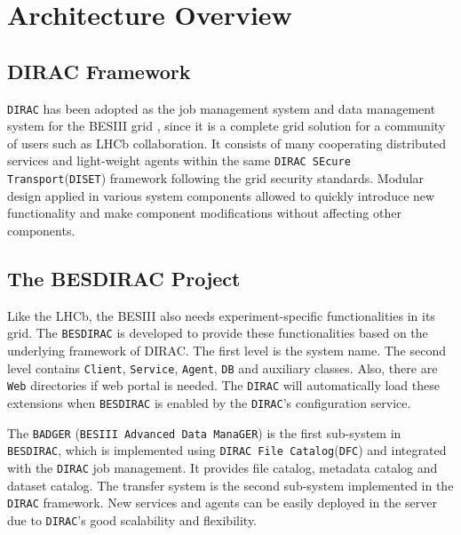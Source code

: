 \section{Architecture Overview}

\subsection{DIRAC Framework}

{\tt DIRAC} \cite{bib:dirac3,bib:diracgit} 
has been adopted as the job management system and data management
system for the BESIII grid \cite{bib:besdfc}, since 
it is a complete grid solution for a community of users such as
LHCb collaboration.
It consists of many cooperating distributed services and light-weight
agents within the same {\tt DIRAC SEcure Transport}({\tt DISET})
framework following the grid
security standards.
Modular design applied in various system components allowed to quickly
introduce new functionality and make component modifications without
affecting other components.

\subsection{The BESDIRAC Project}

Like the LHCb, the BESIII also needs experiment-specific 
functionalities in its grid.
The {\tt BESDIRAC} \cite{bib:besdirac} 
is developed to provide these functionalities
based on the underlying framework of DIRAC.
The first level is the system name. The second level contains
{\tt Client}, {\tt Service}, {\tt Agent}, {\tt DB} and auxiliary classes.
Also, there are {\tt Web} directories if web portal is needed.
The {\tt DIRAC} will automatically load these extensions when 
{\tt BESDIRAC} is enabled by the {\tt DIRAC}'s configuration service.

The {\tt BADGER} (\verb"BESIII Advanced Data ManaGER") is the first sub-system
in {\tt BESDIRAC}, which is implemented using {\tt DIRAC File
Catalog}(\verb"DFC")
and integrated with the {\tt DIRAC} job management.
It provides file catalog, metadata catalog and dataset catalog.
%
The transfer system is the second sub-system implemented in the
{\tt DIRAC} framework. 
New services and agents can be easily deployed in the server
due to {\tt DIRAC}'s good scalability and flexibility.

